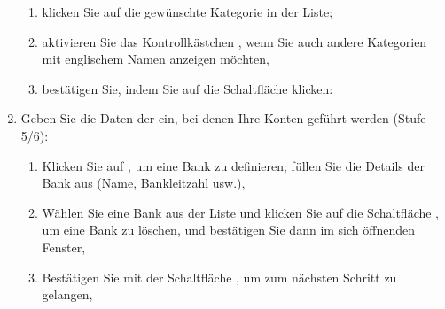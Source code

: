 \begin{enumerate}
		\begin{enumerate} 
			\item klicken Sie auf die gewünschte Kategorie in der Liste;%
			\item aktivieren Sie das Kontrollkästchen , wenn Sie auch andere Kategorien mit englischem Namen anzeigen möchten,%
			\item bestätigen Sie, indem Sie auf die Schaltfläche  klicken:%
		\end{enumerate}

	\item Geben Sie die Daten der  ein, bei denen Ihre Konten geführt werden (Stufe 5/6):%
		\begin{enumerate} 
			\item Klicken Sie auf , um eine Bank zu definieren; füllen Sie die Details der Bank aus (Name, Bankleitzahl usw.),%
			\item Wählen Sie eine Bank aus der Liste und klicken Sie auf die Schaltfläche , um eine Bank zu löschen, und bestätigen Sie dann im sich öffnenden Fenster,%
			\item Bestätigen Sie mit der Schaltfläche , um zum nächsten Schritt zu gelangen, %
		\end{enumerate} 


\end{enumerate}

